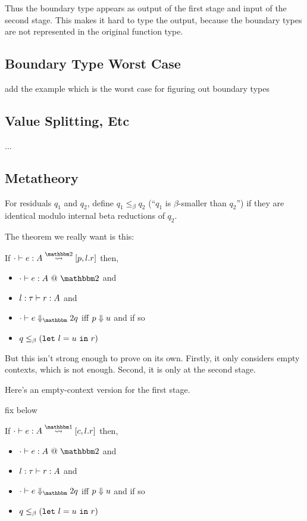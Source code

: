 Thus the boundary type appears as output of the first stage and input of the second stage.
This makes it hard to type the output, because the boundary types are not represented in the original function type.

\subsection {Boundary Type Worst Case}

\TODO add the example which is the worst case for figuring out boundary types



\subsection{Value Splitting, Etc}

...

\subsection{Metatheory}

\begin{definition}
For residuals $q_1$ and $q_2$, define $q_1 \le_\beta q_2$ (``$q_1$ is $\beta$-smaller than $q_2$'') if they are
identical modulo internal beta reductions of $q_2$.
\end{definition}

The theorem we really want is this:

\begin{theorem}
If $\cdot\vdash e : A \splittwosym [p,l.r]$ then,
\begin{itemize}
\item $\cdot \vdash e : A~@~\bbtwo$ and
\item $\types [l:\tau] r A$ and
\item $\diatwo [\cdot] e q$ iff $\reduce p u$ and if so
\item $q \le_\beta (\letin{l}{u}{r})$
\end{itemize}
\end{theorem}

But this isn't strong enough to prove on its own.  
Firstly, it only considers empty contexts, which is not enough.
Second, it is only at the second stage.

Here's an empty-context version for the first stage.

\TODO fix below
\begin{theorem}
If $\cdot\vdash e : A \splitonesym [c,l.r]$ then,
\begin{itemize}
\item $\cdot \vdash e : A~@~\bbtwo$ and
\item $\types [l:\tau] r A$ and
\item $\diatwo [\cdot] e q$ iff $\reduce p u$ and if so
\item $q \le_\beta (\letin{l}{u}{r})$
\end{itemize}
\end{theorem}


